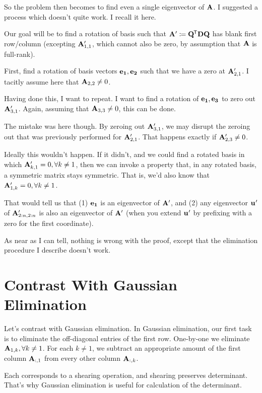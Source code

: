 \documentclass[11pt, oneside]{amsart}
\begin{document}
So the problem then becomes to find even a single eigenvector of
$\mathbf{A}$. I suggested a process which doesn't quite work. I recall it
here.

Our goal will be to find a rotation of basis such that $\mathbf{A}' \coloneqq
\mathbf{Q}^{\mkern-1.5mu\mathsf{T}}\mathbf{D}\mathbf{Q}$ has blank first row/column (excepting $\mathbf{A}'_{1, 1}$, which
cannot also be zero, by assumption that $\mathbf{A}$ is full-rank).

First, find a rotation of basis vectors $\mathbf{e}_{\mathbf{1}}, \mathbf{e}_{\mathbf{2}}$ such that
we have a zero at $\mathbf{A}'_{2, 1}$. I tacitly assume here that $\mathbf{A}_{2,
2} \ne 0$.

Having done this, I want to repeat. I want to find a rotation of
$\mathbf{e}_{\mathbf{1}}, \mathbf{e}_{\mathbf{3}}$ to zero out $\mathbf{A}'_{3, 1}$. Again, assuming that
$\mathbf{A}_{3, 3} \ne 0$, this can be done.

The mistake was here though. By zeroing out $\mathbf{A}'_{3, 1}$, we may
disrupt the zeroing out that was previously performed for $\mathbf{A}'_{2,
1}$. That happens exactly if $\mathbf{A}'_{2, 3} \ne 0$.

Ideally this wouldn't happen. If it didn't, and we could find a rotated
basis in which $\mathbf{A}'_{k, 1} = 0, \forall k\ne 1$, then we can invoke a
property that, in any rotated basis, a symmetric matrix stays symmetric.
That is, we'd also know that $\mathbf{A}'_{1, k} = 0, \forall k\ne 1$.

That would tell us that (1) $\mathbf{e}_{\mathbf{1}}$ is an eigenvector of $\mathbf{A}'$,
and (2) any eigenvector $\mathbf{u_{\mathbf{}}}'$ of $\mathbf{A}'_{2:n, 2:n}$ is also an
eigenvector of $\mathbf{A}'$ (when you extend $\mathbf{u_{\mathbf{}}}'$ by prefixing with a
zero for the first coordinate).

As near as I can tell, nothing is wrong with the proof, except that the
elimination procedure I describe doesn't work.

\section{Contrast With Gaussian Elimination}

Let's contrast with Gaussian elimination. In Gaussian elimination, our
first task is to eliminate the off-diagonal entries of the first row.
One-by-one we eliminate $\mathbf{A}_{1, k}, \forall k \ne 1$. For each $k \ne
1$, we subtract an appropriate amount of the first column $\mathbf{A}_{:, 1}$
from every other column $\mathbf{A}_{:, k}$.

Each  corresponds to a shearing
operation, and shearing preserves determinant. That's why Gaussian
elimination is useful for calculation of the determinant.
\end{document}
